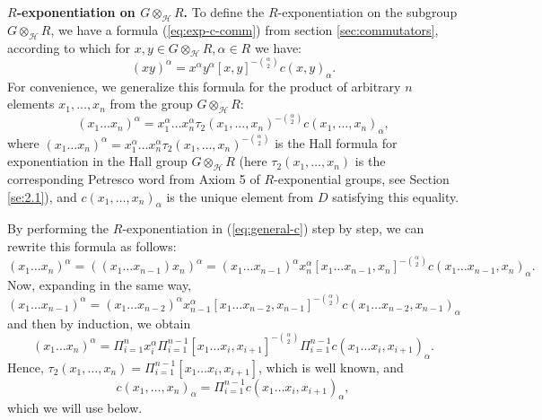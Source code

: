 \documentclass[11pt]{article}
\theoremstyle{definition}
\begin{document}
\medskip
\noindent
{\bf $R$-exponentiation on $G \otimes_{\mathcal{H}} R$.} To define the $R$-exponentiation on the subgroup $G\otimes_{\mathcal{H}} R$, we have a formula (\ref{eq:exp-c-comm}) from section \ref{sec:commutators}, according to which for $x, y \in G\otimes_{\mathcal{H}} R, \alpha \in R$ we have:
$$
(xy)^\alpha = x^\alpha y^\alpha [x,y]^{-\binom{\alpha}{2}} c(x,y)_\alpha.
$$
For convenience, we generalize this formula for the product of arbitrary $n$ elements $x_1, \ldots, x_n$ from the group $G\otimes_{\mathcal{H}} R$:
\begin{equation} \label{eq:general-c}
(x_1 \ldots x_n)^\alpha = x_1^\alpha \ldots x_n^\alpha \tau_2(x_1, \ldots,x_n)^{-\binom{\alpha}{2}} c(x_1, \ldots,x_n)_\alpha,
\end{equation}
where $(x_1 \ldots x_n)^\alpha = x_1^\alpha \ldots x_n^\alpha \tau_2(x_1, \ldots,x_n)^{-\binom{\alpha}{2}} $ is the Hall formula for exponentiation in the Hall group $G \otimes_{\mathcal{H}} R$ (here $\tau_2(x_1, \ldots,x_n)$ is the corresponding Petresco word from Axiom 5 of $R$-exponential groups, see Section \ref{se:2.1}), and
$c(x_1, \ldots,x_n)_\alpha$ is the unique element from $D$ satisfying this equality.

By performing the $R$-exponentiation in (\ref{eq:general-c}) step by step, we can rewrite this formula as follows:
$$
(x_1 \ldots x_n)^\alpha = ((x_1 \ldots x_{n-1})x_n)^\alpha = (x_1 \ldots x_{n-1})^\alpha x_n^\alpha [x_1 \ldots x_{n-1},x_n]^{-\binom{\alpha}{2}} c(x_1 \ldots x_{n-1},x_n)_\alpha.
$$
Now, expanding in the same way,
$$
(x_1 \ldots x_{n-1})^\alpha = (x_1 \ldots x_{n-2})^\alpha x_{n-1}^\alpha [x_1 \ldots x_{n-2},x_{n-1}]^{-\binom{\alpha}{2}} c(x_1 \ldots x_{n-2},x_{n-1})_\alpha
$$
and then by induction, we obtain
\begin{equation} \label{eq:general-formula}
(x_1 \ldots x_n)^\alpha = \Pi_{i = 1}^n x_i^\alpha \Pi_{i = 1}^{n-1}[x_1\ldots x_{i},x_{i+1}]^{-\binom{\alpha}{2}} \Pi_{i = 1}^{n-1} c(x_1\ldots x_i,x_{i+1})_\alpha.
\end{equation}
Hence, $\tau_2(x_1, \ldots,x_n) = \Pi_{i = 1}^{n-1}[x_1\ldots x_{i},x_{i+1}]$, which is well known, and
\begin{equation} \label{eq:long-c}
c(x_1, \ldots,x_n)_\alpha = \Pi_{i = 1}^{n-1} c(x_1\ldots x_i,x_{i+1})_\alpha,
\end{equation}
which we will use below.
\end{document}
